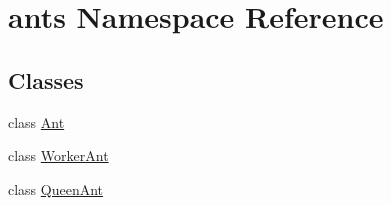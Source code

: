 \hypertarget{namespaceants}{\section{ants Namespace Reference}
\label{namespaceants}
}
\subsection*{Classes}
\begin{DoxyCompactItemize}
\item 
class \hyperlink{classants_1_1Ant}{Ant}
\item 
class \hyperlink{classants_1_1WorkerAnt}{Worker\+Ant}
\item 
class \hyperlink{classants_1_1QueenAnt}{Queen\+Ant}
\end{DoxyCompactItemize}
